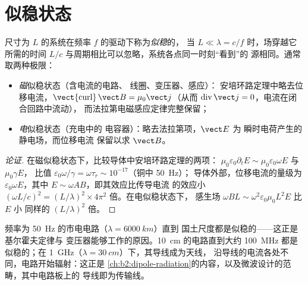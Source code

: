 \section{似稳状态}

\begin{definition}[似稳近似]\label{def:b2:maxwell-equations:arqs}
尺寸为 $L$ 的系统在频率 $f$ 的驱动下称为\emph{似稳}的，
当 $L \ll \lambda = c/f$ 时，场穿越它所需的时间 $L/c$
与周期相比可以忽略，系统各点同一时刻“看到”的
源相同。通常取两种极限：
\begin{itemize}
  \item \emph{磁}似稳状态（含电流的电路、
        线圈、变压器、感应）：
        安培环路定理中略去位移电流，$\operatorname{\vect{curl}}\vect B
        = \mu_0\vect j$（从而 $\operatorname{div}\vect j = 0$，电流在闭合回路中流动），
        而法拉第电磁感应定律完整保留；
  \item \emph{电}似稳状态（充电中的
        电容器）：略去法拉第项，$\vect E$ 为
        瞬时电荷产生的静电场，而位移电流
        保留以求 $\vect B$。
\end{itemize}
\end{definition}

\begin{proof}[论证]
在磁似稳状态下，比较导体中安培环路定理的两项：
$\mu_0\varepsilon_0\partial_t E \sim \mu_0\varepsilon_0\omega E$ 与 $\mu_0\gamma E$，
比值 $\varepsilon_0\omega/\gamma = \omega\tau_r \sim 10^{-17}$（铜中 \qty{50}{Hz}）；
导体外部，位移电流的量级为
$\varepsilon_0\omega E$，其中 $E \sim \omega AB$，即其效应比传导电流
的效应小 $(\omega L/c)^2 = (L/\lambda)^2 \times 4\pi^2$ 倍。在电似稳状态下，
感生场 $\omega BL \sim \omega^2\varepsilon_0\mu_0L^2E$ 比 $E$ 小
同样的 $(L/\lambda)^2$ 倍。
\end{proof}

\begin{example}[电路与天线]\label{ex:b2:maxwell-equations:sizes}
频率为 \qty{50}{Hz} 的市电电路（$\lambda = \qty{6000}{km}$）直到
国土尺度都是似稳的——这正是基尔霍夫定律与
变压器能够工作的原因。\qty{10}{cm} 的电路直到大约
\qty{100}{MHz} 都是似稳的；在 \qty{1}{GHz}（$\lambda = \qty{30}{cm}$）下，其导线成为天线，
沿导线的电流各处不同，电路开始辐射：这正是
\cref{ch:b2:dipole-radiation}的内容，以及微波设计的范畴，其中电路板上的
导线即为传输线。
\end{example}


